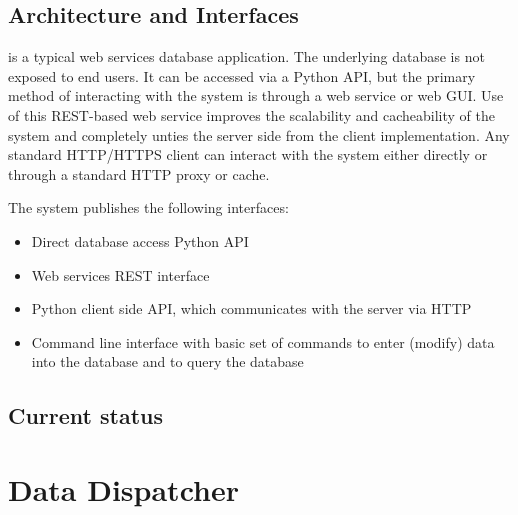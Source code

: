 \documentclass[../main-v1.tex]{subfiles}
\begin{document}
\subsection{Architecture and Interfaces}
 is a typical web services database application. The underlying database is not exposed to end users. It can be accessed via a Python API, but the primary method of interacting with the system is through a web service or web GUI. Use of this REST-based web service improves the scalability and cacheability of the system and completely unties the server side from the client implementation. Any standard HTTP/HTTPS client can interact with the system either directly or through a standard HTTP proxy or cache. 


The system publishes the following interfaces: 
\begin{itemize} 
\item Direct database access Python API 

\item Web services REST interface 

\item Python client side API, which communicates with the server via HTTP 

\item 
Command line interface with basic set of commands to enter (modify) data into the database and to query the database 
\end{itemize}


\subsection{Current status} 




\section{Data Dispatcher}
\end{document}
